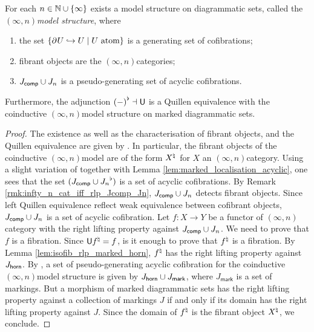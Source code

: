 \begin{thm} \label{thm:n_model_structure_on_dgm_set}
    For each \( n \in \mathbb{N} \cup \left\{ {\infty} \right\} \) exists a model structure on diagrammatic sets, called the \emph{\( (\infty, n) \)\nbd model structure}, where
    \begin{enumerate}
        \item the set \( \left\{ {\partial_{}^{} U \hookrightarrow U \mid U \text{ atom}} \right\} \) is a generating set of cofibrations;
        \item fibrant objects are the \( (\infty, n) \)\nbd categories;
        \item \( J_{\mathsf{comp}} \cup J_{n} \) is a pseudo-generating set of acyclic cofibrations.
    \end{enumerate}
    Furthermore, the adjunction \( {(-)}^{\flat} \dashv \mathsf{U} \) is a Quillen equivalence with the coinductive \( (\infty, n) \)\nbd model structure on marked diagrammatic sets.
\end{thm}
\begin{proof}
    The existence as well as the characterisation of fibrant objects, and the Quillen equivalence are given by \cite[3.27, Theorem 4.21, Theorem 4.23]{chanavat2024model}.
    In particular, the fibrant objects of the coinductive \( (\infty, n) \)\nbd model are of the form \( {X}^{\natural} \) for \( X \) an \( (\infty, n) \)\nbd category.
    Using a slight variation of \cite[Lemma 4.16, Lemma 4.17]{chanavat2024model} together with Lemma \ref{lem:marked_localisation_acyclic}, one sees that the set \( ({J_{\mathsf{comp}} \cup J_{n}}^{\flat}) \) is a set of acyclic cofibrations.
    By Remark \ref{rmk:infty_n_cat_iff_rlp_Jcomp_Jn}, \( J_{\mathsf{comp}} \cup J_{n} \) detects fibrant objects.
    Since left Quillen equivalence reflect weak equivalence between cofibrant objects, \( J_{\mathsf{comp}} \cup J_{n} \) is a set of acyclic cofibration.
    Let \( f \colon X \to Y \) be a functor of \( (\infty, n) \)\nbd category with the right lifting property against \( J_{\mathsf{comp}} \cup J_{n} \).
    We need to prove that \( f \) is a fibration.
    Since \( \mathsf{U}{f}^{\natural} = f \), is it enough to prove that \( {f}^{\natural} \) is a fibration. 
    By Lemma \ref{lem:isofib_rlp_marked_horn}, \( {f}^{\natural} \) has the right lifting property against \( J_{\mathsf{horn}} \).
    By \cite[Theorem 4.22]{chanavat2025gray}, a set of pseudo-generating acyclic cofibration for the coinductive \( (\infty, n) \)\nbd model structure is given by \( J_{\mathsf{horn}} \cup J_{\mathsf{mark}} \), where \( J_{\mathsf{mark}} \) is a set of markings.
    But a morphism of marked diagrammatic sets has the right lifting property against a collection of markings \( J \) if and only if its domain has the right lifting property against \( J \).
    Since the domain of \( {f}^{\natural} \) is the fibrant object \( {X}^{\natural} \), we conclude.
\end{proof}

